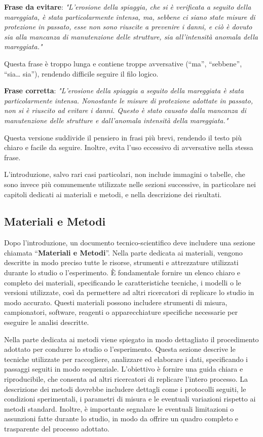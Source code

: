 \documentclass[9pt,a4paper,twoside]{rho-class/rho}
\begin{document}
\begin{info}
\textbf{Frase da evitare}:
\textit{"L’erosione della spiaggia, che si è verificata a seguito della mareggiata, è stata particolarmente intensa, ma, sebbene ci siano state misure di protezione in passato, esse non sono riuscite a prevenire i danni, e ciò è dovuto sia alla mancanza di manutenzione delle strutture, sia all’intensità anomala della mareggiata."}

Questa frase è troppo lunga e contiene troppe avversative (“ma”, “sebbene”, “sia… sia”), rendendo difficile seguire il filo logico.

\textbf{Frase corretta}:
\textit{"L’erosione della spiaggia a seguito della mareggiata è stata particolarmente intensa. Nonostante le misure di protezione adottate in passato, non si è riuscito ad evitare i danni. Questo è stato causato dalla mancanza di manutenzione delle strutture e dall’anomala intensità della mareggiata."}

Questa versione suddivide il pensiero in frasi più brevi, rendendo il testo più chiaro e facile da seguire. Inoltre, evita l’uso eccessivo di avversative nella stessa frase.
\end{info}

L’introduzione, salvo rari casi particolari, non include immagini o tabelle, che sono invece più comunemente utilizzate nelle sezioni successive, in particolare nei capitoli dedicati ai materiali e metodi, e nella descrizione dei risultati.

\subsection{Materiali e Metodi}
Dopo l’introduzione, un documento tecnico-scientifico deve includere una sezione chiamata “\textbf{Materiali e Metodi}”. Nella parte dedicata ai materiali, vengono descritte in modo preciso tutte le risorse, strumenti e attrezzature utilizzati durante lo studio o l’esperimento. È fondamentale fornire un elenco chiaro e completo dei materiali, specificando le caratteristiche tecniche, i modelli o le versioni utilizzate, così da permettere ad altri ricercatori di replicare lo studio in modo accurato. Questi materiali possono includere strumenti di misura, campionatori, software, reagenti o apparecchiature specifiche necessarie per eseguire le analisi descritte.

Nella parte dedicata ai metodi viene spiegato in modo dettagliato il procedimento adottato per condurre lo studio o l’esperimento. Questa sezione descrive le tecniche utilizzate per raccogliere, analizzare ed elaborare i dati, specificando i passaggi seguiti in modo sequenziale. L’obiettivo è fornire una guida chiara e riproducibile, che consenta ad altri ricercatori di replicare l’intero processo. La descrizione dei metodi dovrebbe includere dettagli come i protocolli seguiti, le condizioni sperimentali, i parametri di misura e le eventuali variazioni rispetto ai metodi standard. Inoltre, è importante segnalare le eventuali limitazioni o assunzioni fatte durante lo studio, in modo da offrire un quadro completo e trasparente del processo adottato.
\end{document}
